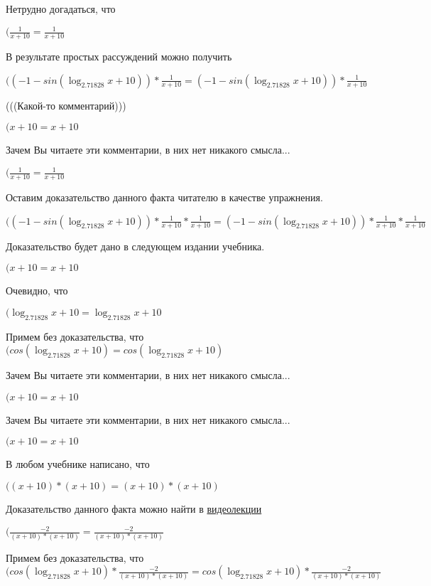 \documentclass[12pt,a4paper,fleqn]{article}
\theoremstyle{definition}
\begin{document}
Нетрудно догадаться, что

$(\frac{ 1 }{ x  +  10 }
 = \frac{ 1 }{ x  +  10 }
$

В результате простых рассуждений можно получить

$(( -1  - sin(\log_{ 2.71828 }{ x  +  10 })) * \frac{ 1 }{ x  +  10 }
 = ( -1  - sin(\log_{ 2.71828 }{ x  +  10 })) * \frac{ 1 }{ x  +  10 }
$

(((Какой-то комментарий)))

$( x  +  10  =  x  +  10 $

Зачем Вы читаете эти комментарии, в них нет никакого смысла...

$(\frac{ 1 }{ x  +  10 }
 = \frac{ 1 }{ x  +  10 }
$

Оставим доказательство данного факта читателю в качестве упражнения.

$(( -1  - sin(\log_{ 2.71828 }{ x  +  10 })) * \frac{ 1 }{ x  +  10 }
 * \frac{ 1 }{ x  +  10 }
 = ( -1  - sin(\log_{ 2.71828 }{ x  +  10 })) * \frac{ 1 }{ x  +  10 }
 * \frac{ 1 }{ x  +  10 }
$

Доказательство будет дано в следующем издании учебника.

$( x  +  10  =  x  +  10 $

Очевидно, что

$(\log_{ 2.71828 }{ x  +  10 } = \log_{ 2.71828 }{ x  +  10 }$

Примем без доказательства, что
$(cos(\log_{ 2.71828 }{ x  +  10 }) = cos(\log_{ 2.71828 }{ x  +  10 })$

Зачем Вы читаете эти комментарии, в них нет никакого смысла...

$( x  +  10  =  x  +  10 $

Зачем Вы читаете эти комментарии, в них нет никакого смысла...

$( x  +  10  =  x  +  10 $

В любом учебнике написано, что

$(( x  +  10 ) * ( x  +  10 ) = ( x  +  10 ) * ( x  +  10 )$

Доказательство данного факта можно найти в \href{https://www.youtube.com/watch?v=dQw4w9WgXcQ}{видеолекции}

$(\frac{ -2 }{( x  +  10 ) * ( x  +  10 )}
 = \frac{ -2 }{( x  +  10 ) * ( x  +  10 )}
$

Примем без доказательства, что
$(cos(\log_{ 2.71828 }{ x  +  10 }) * \frac{ -2 }{( x  +  10 ) * ( x  +  10 )}
 = cos(\log_{ 2.71828 }{ x  +  10 }) * \frac{ -2 }{( x  +  10 ) * ( x  +  10 )}
$
\end{document}
